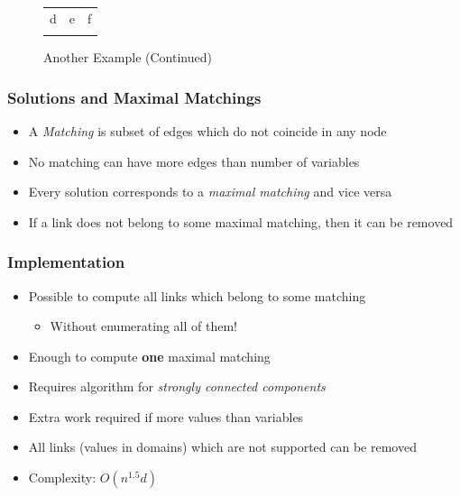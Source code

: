 \begin{figure}[ht]
\caption{Another Example (Continued)}
\begin{center}
\begin{tabular}{ccc}
d & e & f \\
\begin{tikzpicture}\end{tikzpicture}
&
\begin{tikzpicture}\end{tikzpicture}
&
\begin{tikzpicture}\end{tikzpicture}
\end{tabular}
\end{center}
\end{figure}



\begin{frame}
\frametitle{Solutions and Maximal Matchings}
\begin{itemize}
\item A {\em Matching} is subset of edges which do not coincide in any node
\item No matching can have more edges than number of variables
\item Every solution corresponds to a {\em maximal matching} and vice versa
\item If a link does not belong to some maximal matching, then it can be removed 
\end{itemize}
\end{frame}

\begin{frame}
\frametitle{Implementation}
\begin{itemize}
\item Possible to compute all links which belong to some matching
\begin{itemize}
\item Without enumerating all of them!
\end{itemize}
\item Enough to compute {\bf one} maximal matching
\item Requires algorithm for {\em strongly connected components}
\item Extra work required if more values than variables
\item All links (values in domains) which are not supported can be removed
\item Complexity: $O(n^{1.5}d)$
\end{itemize}
\end{frame}

